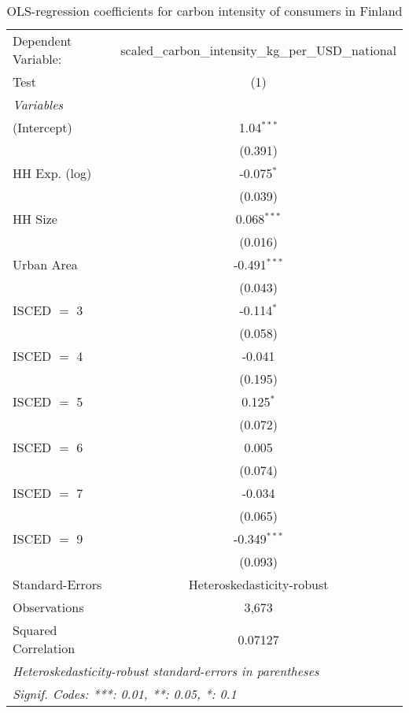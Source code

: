
\begin{table}[htbp!]
   \centering
   \small
   \begin{adjustbox}{width = 1\textwidth, max height = 0.95\textheight, center}
      \begin{threeparttable}[b]
         \caption{\label{tab:OLS_1_FIN} OLS-regression coefficients for carbon intensity of consumers in Finland}
         \begin{tabular}{lc}
            \tabularnewline \midrule \midrule
            Dependent Variable: & scaled\_carbon\_intensity\_kg\_per\_USD\_national\\        
            Test                & (1)\\  
            \midrule
            \emph{Variables}\\
            (Intercept)         & 1.04$^{***}$\\   
                                & (0.391)\\   
            HH Exp. (log)       & -0.075$^{*}$\\   
                                & (0.039)\\   
            HH Size             & 0.068$^{***}$\\   
                                & (0.016)\\   
            Urban Area          & -0.491$^{***}$\\   
                                & (0.043)\\   
            ISCED $=$ 3         & -0.114$^{*}$\\   
                                & (0.058)\\   
            ISCED $=$ 4         & -0.041\\   
                                & (0.195)\\   
            ISCED $=$ 5         & 0.125$^{*}$\\   
                                & (0.072)\\   
            ISCED $=$ 6         & 0.005\\   
                                & (0.074)\\   
            ISCED $=$ 7         & -0.034\\   
                                & (0.065)\\   
            ISCED $=$ 9         & -0.349$^{***}$\\   
                                & (0.093)\\   
            \midrule 
            Standard-Errors     & Heteroskedasticity-robust \\   
            Observations        & 3,673\\  
            Squared Correlation & 0.07127\\  
            \midrule \midrule
            \multicolumn{2}{l}{\emph{Heteroskedasticity-robust standard-errors in parentheses}}\\
            \multicolumn{2}{l}{\emph{Signif. Codes: ***: 0.01, **: 0.05, *: 0.1}}\\
         \end{tabular}
         

\end{threeparttable}
\end{adjustbox}
\end{table}
